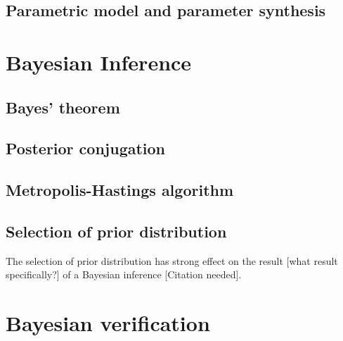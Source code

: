 \subsection{Parametric model and parameter synthesis}


\section{Bayesian Inference}
\subsection{Bayes' theorem}
\subsection{Posterior conjugation}
\subsection{Metropolis-Hastings algorithm}
\subsection{Selection of prior distribution}
The selection of prior distribution has strong effect on the result [what result
        specifically?] of a Bayesian inference {\color{red}[Citation needed]}.

\section{Bayesian verification}